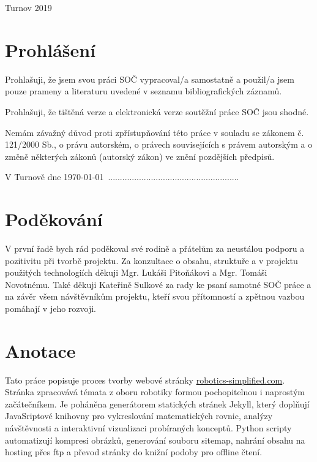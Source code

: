 \documentclass[a4paper, 12pt]{article}
\begin{document}
  \fontsize{12}{14.4} \selectfont
  Turnov 2019

  \vspace{4em}

  \newpage

  \section*{\normalfont\textbf{Prohlášení}}
  Prohlašuji, že jsem svou práci SOČ vypracoval/a samostatně a použil/a jsem pouze prameny a literaturu uvedené v seznamu bibliografických záznamů.

  Prohlašuji, že tištěná verze a elektronická verze soutěžní práce SOČ jsou shodné.

  Nemám závažný důvod proti zpřístupňování této práce v souladu se zákonem č. 121/2000 Sb., o právu autorském, o právech souvisejících s právem autorským a o změně některých zákonů (autorský zákon) ve znění pozdějších předpisů.

  \qquad

  V Turnově dne \today \, .......................................................\\%

  \newpage

  \section*{\normalfont\textbf{Poděkování}}
  V první řadě bych rád poděkoval své rodině a přátelům za neustálou podporu a pozitivitu při tvorbě projektu. Za konzultace o obsahu, struktuře a v projektu použitých technologiích děkuji Mgr. Lukáši Pitoňákovi a Mgr. Tomáši Novotnému. Také děkuji Kateřině Sulkové za rady ke psaní samotné SOČ práce a na závěr všem návštěvníkům projektu, kteří svou přítomností a zpětnou vazbou pomáhají v jeho rozvoji.

  \newpage

  \section*{\normalfont\textbf{Anotace}}
  Tato práce popisuje proces tvorby webové stránky \url{robotics-simplified.com}. Stránka zpracovává témata z oboru robotiky formou pochopitelnou i naprostým začátečníkem. Je poháněna generátorem statických stránek Jekyll, který doplňují JavaSriptové knihovny pro vykreslování matematických rovnic, analýzy návštěvnosti a interaktivní vizualizaci probíraných konceptů. Python scripty automatizují kompresi obrázků, generování souboru sitemap, nahrání obsahu na hosting přes \acrshort{ftp} a převod stránky do knižní podoby pro offline čtení.
\end{document}
